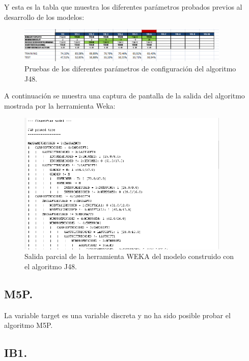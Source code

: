 Y esta es la tabla que muestra los diferentes parámetros probados previos al desarrollo de los modelos:

\begin{figure}[H]
\begin{center}
\includegraphics[width=0.9\textwidth]{img/j48-2}
\caption{Pruebas de los diferentes parámetros de configuración del algoritmo J48.}
\end{center}
\end{figure}

A continuación se muestra una captura de pantalla de la salida del algoritmo mostrada por la herramienta Weka:

\begin{figure}[H]
\begin{center}
\includegraphics[width=0.9\textwidth]{img/j48-3}
\caption{Salida parcial de la herramienta WEKA del modelo construido con el algoritmo J48.}
\end{center}
\end{figure}

\subsection{M5P.}

La variable target es una variable discreta y no ha sido posible probar el algoritmo M5P.

\subsection{IB1.}

